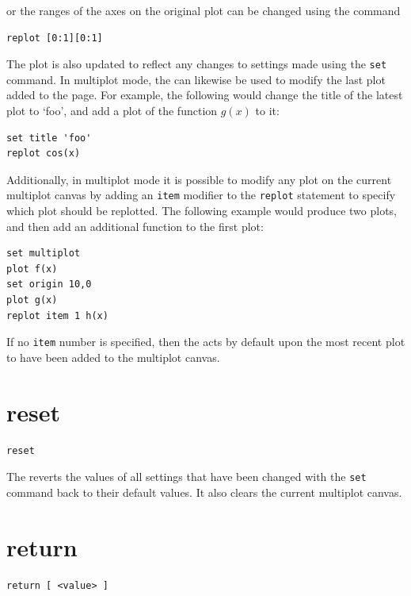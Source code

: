 \noindent or the ranges of the axes on the original plot can be changed using
the command

\begin{verbatim}
replot [0:1][0:1]
\end{verbatim}

\noindent The plot is also updated to reflect any changes to settings made
using the {\tt set} command.  In multiplot mode, the  can
likewise be used to modify the last plot added to the page. For example, the
following would change the title of the latest plot to `foo', and add a plot of
the function $g(x)$ to it:

\begin{verbatim}
set title 'foo'
replot cos(x)
\end{verbatim}

Additionally, in multiplot mode it is possible to modify any plot on the
current multiplot canvas by adding an {\tt item} modifier to the {\tt replot}
statement to specify which plot should be replotted.  The following example
would produce two plots, and then add an additional function to the first plot:

\begin{verbatim}
set multiplot
plot f(x)
set origin 10,0
plot g(x)
replot item 1 h(x)
\end{verbatim}

If no {\tt item} number is specified, then the  acts by default
upon the most recent plot to have been added to the multiplot canvas.


\section{reset}

\begin{verbatim}
reset
\end{verbatim}

The  reverts the values of all settings that have been changed
with the {\tt set} command back to their default values. It also clears the
current multiplot canvas.


\section{return}

\begin{verbatim}
return [ <value> ]
\end{verbatim}

